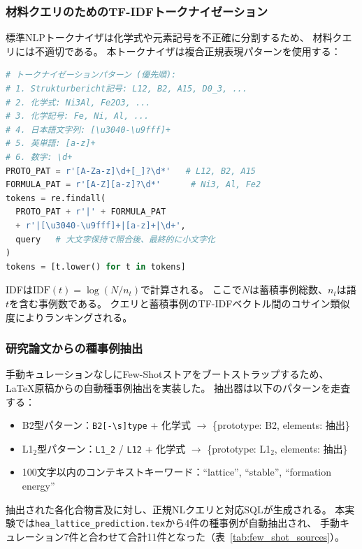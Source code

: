 \documentclass[5p,twocolumn]{elsarticle}
\begin{document}
\subsubsection{材料クエリのためのTF-IDFトークナイゼーション}

標準NLPトークナイザは化学式や元素記号を不正確に分割するため、
材料クエリには不適切である。
本トークナイザは複合正規表現パターンを使用する：

\begin{lstlisting}[language=Python,caption={材料クエリ用TF-IDFトークナイザ。},label=lst:tokenizer,numbers=none]
# トークナイゼーションパターン (優先順):
# 1. Strukturbericht記号: L12, B2, A15, D0_3, ...
# 2. 化学式: Ni3Al, Fe2O3, ...
# 3. 化学記号: Fe, Ni, Al, ...
# 4. 日本語文字列: [\u3040-\u9fff]+
# 5. 英単語: [a-z]+
# 6. 数字: \d+
PROTO_PAT = r'[A-Za-z]\d+[_]?\d*'   # L12, B2, A15
FORMULA_PAT = r'[A-Z][a-z]?\d*'      # Ni3, Al, Fe2
tokens = re.findall(
  PROTO_PAT + r'|' + FORMULA_PAT
  + r'|[\u3040-\u9fff]+|[a-z]+|\d+',
  query   # 大文字保持で照合後、最終的に小文字化
)
tokens = [t.lower() for t in tokens]
\end{lstlisting}

IDFは$\text{IDF}(t) = \log(N / n_t)$で計算される。
ここで$N$は蓄積事例総数、$n_t$は語$t$を含む事例数である。
クエリと蓄積事例のTF-IDFベクトル間のコサイン類似度によりランキングされる。

\subsubsection{研究論文からの種事例抽出}

手動キュレーションなしにFew-Shotストアをブートストラップするため、
LaTeX原稿からの自動種事例抽出を実装した。
抽出器は以下のパターンを走査する：

\begin{itemize}
  \item B2型パターン：\texttt{B2[-\textbackslash{}s]type} + 化学式 $\to$ \{prototype: B2, elements: 抽出\}
  \item L1$_2$型パターン：\texttt{L1\_2} / \texttt{L12} + 化学式 $\to$ \{prototype: L1$_2$, elements: 抽出\}
  \item 100文字以内のコンテキストキーワード：``lattice'', ``stable'', ``formation energy''
\end{itemize}

抽出された各化合物言及に対し、正規NLクエリと対応SQLが生成される。
本実験では\texttt{hea\_lattice\_prediction.tex}から4件の種事例が自動抽出され、
手動キュレーション7件と合わせて合計11件となった（表~\ref{tab:few_shot_sources}）。
\end{document}
